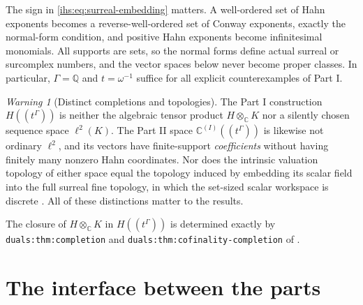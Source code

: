 \documentclass[11pt,a4paper]{article}
\numberwithin{equation}{section}
\theoremstyle{definition}
\theoremstyle{remark}
\newtheorem{warning}[warning]{Warning}
\newcommand{\C}{\mathbb C}
\newcommand{\Q}{\mathbb Q}
\newcommand{\K}{K}
\begin{document}
The sign in \eqref{ihs:eq:surreal-embedding} matters. A well-ordered set of
Hahn exponents becomes a reverse-well-ordered set of Conway exponents,
exactly the normal-form condition, and positive Hahn exponents become
infinitesimal monomials. All supports are sets, so the normal forms define
actual surreal or surcomplex numbers, and the vector spaces below never
become proper classes. In particular, $\Gamma=\Q$ and $t=\omega^{-1}$
suffice for all explicit counterexamples of Part I.

\begin{warning}[Distinct completions and topologies]\label{ihs:warn:three}
The Part I construction $H((t^\Gamma))$ is neither the algebraic tensor
product $H\otimes_\C\K$ nor a silently chosen sequence space $\ell^2(\K)$.
The Part II space $\C^{(I)}((t^\Gamma))$ is likewise not ordinary $\ell^2$,
and its vectors have finite-support \emph{coefficients} without having
finitely many nonzero Hahn coordinates. Nor does the intrinsic valuation
topology of either space equal the topology induced by embedding its scalar
field into the full surreal fine topology, in which the set-sized scalar
workspace is discrete \cite{RepoMap}. All of these distinctions matter to
the results.
\end{warning}

The closure of $H\otimes_\C\K$ in $H((t^\Gamma))$ is determined exactly by
\texttt{duals:thm:completion} and \texttt{duals:thm:cofinality-completion} of
.

\section{The interface between the parts}\label{ihs:sec:interface}
\end{document}

